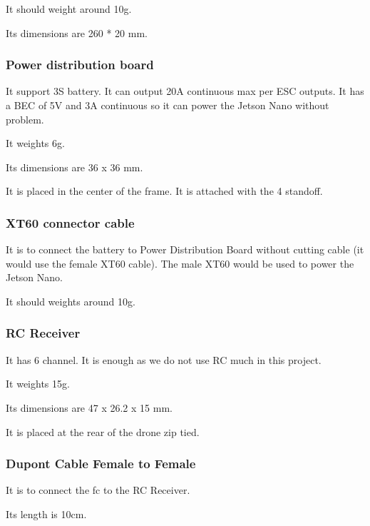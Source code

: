                 It should weight around 10g.
                
                Its dimensions are 260 * 20 mm.
                
            \subsubsection{Power distribution board}
                It support 3S battery. It can output 20A continuous max per ESC outputs. It has a BEC of 5V and 3A continuous so it can power the Jetson Nano without problem.
                
                It weights 6g.
                
                Its dimensions are 36 x 36 mm.
                
                It is placed in the center of the frame. It is attached with the 4 standoff.
                
            \subsubsection{XT60 connector cable}
                It is to connect the battery to Power Distribution Board without cutting cable (it would use the female XT60 cable). The male XT60 would be used to power the Jetson Nano.
                
                It should weights around 10g.
                
            \subsubsection{RC Receiver}
                It has 6 channel. It is enough as we do not use RC much in this project.
                
                It weights 15g.
                
                Its dimensions are 47 x 26.2 x 15 mm.
                
                It is placed at the rear of the drone zip tied.
                
            \subsubsection{Dupont Cable Female to Female}
                It is to connect the \gls{fc} to the RC Receiver.
                
                Its length is 10cm.
                
